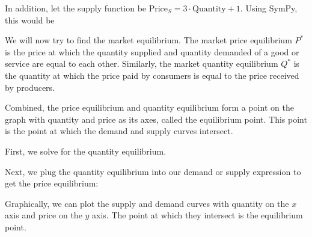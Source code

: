 \documentclass[letterpaper,10pt,english]{jupyterBook}
\begin{document}
\noindent{}

\sphinxAtStartPar
In addition, let the supply function be \(\text{Price}_{S}=3 \cdot \text{Quantity} + 1\). Using SymPy, this would be

\begin{sphinxVerbatim}[commandchars=\\\{\}]
      
\end{sphinxVerbatim}

\noindent{}

\sphinxAtStartPar
We will now try to find the market equilibrium. The market price equilibrium \(P^*\) is the price at which the quantity supplied and quantity demanded of a good or service are equal to each other. Similarly, the market quantity equilibrium \(Q^*\) is the quantity at which the price paid by consumers is equal to the price received by producers.

\sphinxAtStartPar
Combined, the price equilibrium and quantity equilibrium form a point on the graph with quantity and price as its axes, called the equilibrium point. This point is the point at which the demand and supply curves intersect.

\sphinxAtStartPar
First, we solve for the quantity equilibrium.

\begin{sphinxVerbatim}[commandchars=\\\{\}]
   
\end{sphinxVerbatim}

\noindent{}

\sphinxAtStartPar
Next, we plug the quantity equilibrium into our demand or supply expression to get the price equilibrium:

\begin{sphinxVerbatim}[commandchars=\\\{\}]
 
\end{sphinxVerbatim}

\noindent{}

\sphinxAtStartPar
Graphically, we can plot the supply and demand curves with quantity on the \(x\) axis and price on the \(y\) axis. The point at which they intersect is the equilibrium point.
\end{document}
